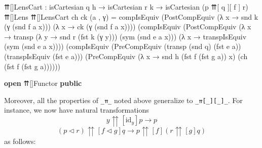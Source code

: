 \documentclass[
  11pt,
  oneside,
  article]{memoir}
\newenvironment{Shaded}{}{}
\newcommand{\KeywordTok}[1]{\textcolor[rgb]{0.00,0.44,0.13}{\textbf{#1}}}
\newcommand{\NormalTok}[1]{#1}
\newcommand{\OtherTok}[1]{\textcolor[rgb]{0.00,0.44,0.13}{#1}}
\theoremstyle{definition}
\theoremstyle{plain}
\newcommand{\0}{\textsf{0}}
\newcommand{\1}{\tn{\textsf{1}}}
\begin{document}
\begin{Shaded}
\begin{Highlighting}[]
\NormalTok{    ⇈[]LensCart }\OtherTok{:}\NormalTok{ isCartesian q h }\OtherTok{→}\NormalTok{ isCartesian r\textquotesingle{} k}
                  \OtherTok{→}\NormalTok{ isCartesian }\OtherTok{(}\NormalTok{p\textquotesingle{} ⇈[ q\textquotesingle{} ][ f\textquotesingle{} ] r\textquotesingle{}}\OtherTok{)}\NormalTok{ ⇈[]Lens}
\NormalTok{    ⇈[]LensCart ch ck }\OtherTok{(}\NormalTok{a , γ}\OtherTok{)} \OtherTok{=} 
\NormalTok{        compIsEquiv }
            \OtherTok{(}\NormalTok{PostCompEquiv }\OtherTok{(λ}\NormalTok{ x }\OtherTok{→}\NormalTok{ snd k }\OtherTok{(}\NormalTok{γ }\OtherTok{(}\NormalTok{snd f a x}\OtherTok{)))} 
                           \OtherTok{(λ}\NormalTok{ x }\OtherTok{→}\NormalTok{ ck }\OtherTok{(}\NormalTok{γ }\OtherTok{(}\NormalTok{snd f a x}\OtherTok{))))} 
            \OtherTok{(}\NormalTok{compIsEquiv }
                \OtherTok{(}\NormalTok{PostCompEquiv }
                    \OtherTok{(λ}\NormalTok{ x }\OtherTok{→}\NormalTok{ transp }\OtherTok{(λ}\NormalTok{ y }\OtherTok{→}\NormalTok{ snd r\textquotesingle{} }\OtherTok{(}\NormalTok{fst k }\OtherTok{(}\NormalTok{γ y}\OtherTok{)))} 
                                  \OtherTok{(}\NormalTok{sym }\OtherTok{(}\NormalTok{snd e a x}\OtherTok{)))} 
                    \OtherTok{(λ}\NormalTok{ x }\OtherTok{→}\NormalTok{ transpIsEquiv }\OtherTok{(}\NormalTok{sym }\OtherTok{(}\NormalTok{snd e a x}\OtherTok{))))} 
                \OtherTok{(}\NormalTok{compIsEquiv }
                    \OtherTok{(}\NormalTok{PreCompEquiv }\OtherTok{(}\NormalTok{transp }\OtherTok{(}\NormalTok{snd q}\OtherTok{)} \OtherTok{(}\NormalTok{fst e a}\OtherTok{))} 
                                  \OtherTok{(}\NormalTok{transpIsEquiv }\OtherTok{(}\NormalTok{fst e a}\OtherTok{)))} 
                    \OtherTok{(}\NormalTok{PreCompEquiv }\OtherTok{(λ}\NormalTok{ x }\OtherTok{→}\NormalTok{ snd h }\OtherTok{(}\NormalTok{fst f\textquotesingle{} }\OtherTok{(}\NormalTok{fst g a}\OtherTok{))}\NormalTok{ x}\OtherTok{)} 
                                  \OtherTok{(}\NormalTok{ch }\OtherTok{(}\NormalTok{fst f\textquotesingle{} }\OtherTok{(}\NormalTok{fst g a}\OtherTok{))))))}

\KeywordTok{open}\NormalTok{ ⇈[]Functor }\KeywordTok{public}
\end{Highlighting}
\end{Shaded}

Moreover, all the properties of \texttt{\_⇈\_} noted above generalize to
\texttt{\_⇈{[}\_{]}{[}\_{]}\_}. For instance, we now have natural
transformations \[
y {\upuparrows}[\text{id}_{y}] p \to p
\] \[
(p \triangleleft r) {\upuparrows}[f \triangleleft g] q \to p {\upuparrows}[f] (r {\upuparrows}[g] q)
\] as follows:
\end{document}
